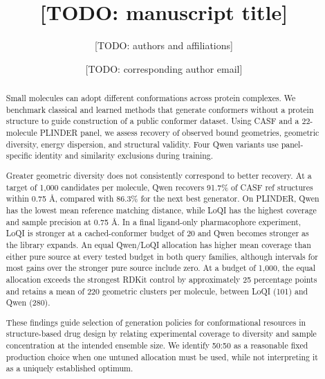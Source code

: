 \documentclass[letterpaper]{article}
\author{[TODO: authors and affiliations]}
\title{[TODO: manuscript title]}
\date{[TODO: corresponding author email]}
\begin{document}
\maketitle

\begin{abstract}
Small molecules can adopt different conformations across protein complexes. We benchmark
classical and learned methods that generate conformers without a protein structure to guide
construction of a public conformer dataset. Using CASF and a 22-molecule PLINDER panel,
we assess recovery of observed bound geometries, geometric diversity, energy dispersion,
and structural validity. Four Qwen variants use panel-specific identity and similarity
exclusions during training.

Greater geometric diversity does not consistently correspond to better recovery.
At a target of 1,000 candidates per molecule, Qwen recovers 91.7\% of CASF ref structures
within 0.75 \AA{}, compared with 86.3\% for the next best generator. On PLINDER,
Qwen has the lowest mean reference matching distance, while LoQI has the highest
coverage and sample precision at 0.75 \AA{}. In a final ligand-only pharmacophore
experiment, LoQI is stronger at a cached-conformer budget of 20 and Qwen becomes
stronger as the library expands. An equal Qwen/LoQI allocation has higher mean
coverage than either pure source at every tested budget in both query families,
although intervals for most gains over the stronger pure source include zero. At
a budget of 1,000, the equal allocation exceeds the strongest RDKit control by
approximately 25 percentage points and retains a mean of 220 geometric clusters
per molecule, between LoQI (101) and Qwen (280).

These findings guide selection of generation policies for conformational resources
in structure-based drug design by relating experimental coverage to diversity and
sample concentration at the intended ensemble size. We identify 50:50 as a reasonable
fixed production choice when one untuned allocation must be used, while not
interpreting it as a uniquely established optimum.
\end{abstract}



\end{document}
